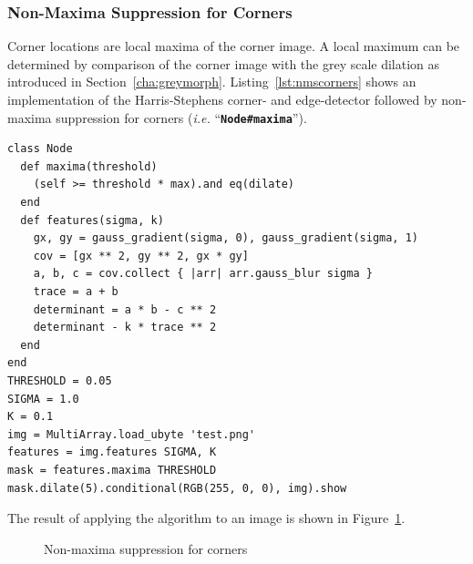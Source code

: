 \documentclass[12pt,a4paper,oneside,openright]{book}
\newcommand{\ie}{\emph{i.e.} }
\newcommand{\sct}[1]{Section~\ref{cha:#1}}
\newcommand{\fig}[1]{Figure~\ref{fig:#1}}
\newcommand{\lst}[1]{Listing~\ref{lst:#1}}
\newcommand{\code}[1]{``\texttt{\textbf{\textcolor{codegray}{\small{#1}}}}''}
\begin{document}
\begin{CJK}{UTF8}{}
\subsubsection{Non-Maxima Suppression for Corners}\label{cha:nmscorner}
Corner locations are local maxima of the corner image. A local maximum can be determined by comparison of the corner image with the grey scale dilation as introduced in \sct{greymorph}. \lst{nmscorners} shows an implementation of the Harris-Stephens corner- and edge-detector followed by non-maxima suppression for corners (\ie \code{Node\#maxima}).
\lstset{language=Ruby,frame=single,numbers=none}
\begin{lstlisting}[float,caption={Non-maxima suppression for corners},escapechar=\$,label=lst:nmscorners]
class Node
  def maxima(threshold)
    (self >= threshold * max).and eq(dilate)
  end
  def features(sigma, k)
    gx, gy = gauss_gradient(sigma, 0), gauss_gradient(sigma, 1)
    cov = [gx ** 2, gy ** 2, gx * gy]
    a, b, c = cov.collect { |arr| arr.gauss_blur sigma }
    trace = a + b
    determinant = a * b - c ** 2
    determinant - k * trace ** 2
  end
end
THRESHOLD = 0.05
SIGMA = 1.0
K = 0.1
img = MultiArray.load_ubyte 'test.png'
features = img.features SIGMA, K
mask = features.maxima THRESHOLD
mask.dilate(5).conditional(RGB(255, 0, 0), img).show
\end{lstlisting}
The result of applying the algorithm to an image is shown in \fig{nmscorners}.
\begin{figure}[htbp]
   \begin{center}
     \begin{minipage}[c]{.45\textwidth}
     \end{minipage}
     \begin{minipage}[c]{.45\textwidth}
     \end{minipage}
     \caption{Non-maxima suppression for corners\label{fig:nmscorners}}
   \end{center}
\end{figure}


\end{CJK}
\end{document}
